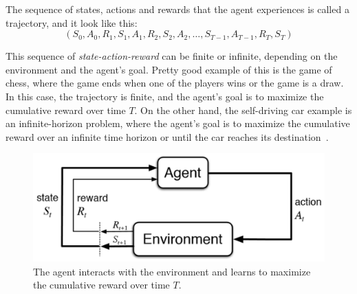 \documentclass[../xlapes02]{subfiles}
\begin{document}

    The sequence of states, actions and rewards that the agent experiences is called a trajectory, and it look like this:
    \begin{equation}
        \label{eq:trajectory}
        (S_0, A_0, R_1, S_1, A_1, R_2, S_2, A_2, \dots, S_{T-1}, A_{T-1}, R_T, S_T)
    \end{equation}

    This sequence of \emph{state-action-reward} can be finite or infinite, depending on the environment and the agent's goal. Pretty good example of this is the game of chess, where the game ends when one of the players wins or the game is a draw. In this case, the trajectory is finite, and the agent's goal is to maximize the cumulative reward over time $T$. On the other hand, the self-driving car example is an infinite-horizon problem, where the agent's goal is to maximize the cumulative reward over an infinite time horizon or until the car reaches its destination~\cite{FITMT25127}.

    \begin{figure}[h]
        \includegraphics[width=0.7\linewidth]{image/agent-environment}
        \centering
        \caption{The agent interacts with the environment and learns to maximize the cumulative reward over time $T$.}
        \label{fig:rl-introduction}
    \end{figure}
\end{document}
